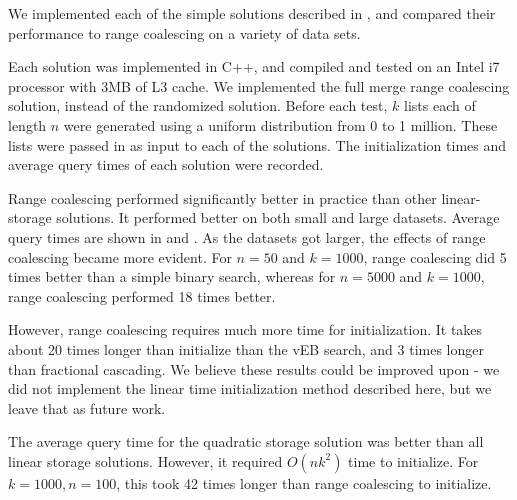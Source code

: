 We implemented each of the simple solutions described in 
, and compared their performance to range coalescing on a variety of data sets. 

Each solution was implemented in C++, and compiled and tested on an Intel i7 processor with 3MB of L3 cache. We implemented the full merge range coalescing solution, instead of the randomized solution. Before each test, $k$ lists each of length $n$ were generated using a uniform distribution from 0 to 1 million. These lists were passed in as input to each of the solutions.  The initialization times and average query times of each solution were recorded. 

Range coalescing performed significantly better in practice than other 
linear-storage solutions. It performed better on both small and large datasets. Average query times are shown in  and .
As the datasets got larger, the effects of range coalescing became more evident. 
For $n=50$ and $k=1000$, range coalescing did 5 times better than a simple binary search,
whereas for $n=5000$ and $k=1000$, range coalescing performed 18 times better.

However, range coalescing requires much more time for initialization. 
It takes about 20 times longer than initialize than the vEB search, and 3 times longer
than fractional cascading. We believe these results could be improved upon - we did not implement the linear time initialization method described here, but we leave that as future work.

The average query time for the quadratic storage solution was better than all 
linear storage solutions. However, it required $O(nk^2)$ time to initialize. For $k=1000,n=100$, this took 42 times longer than range coalescing to initialize.


